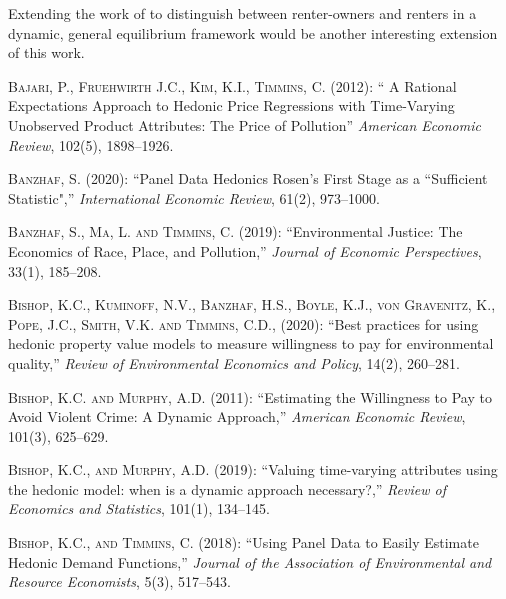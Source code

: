\documentclass[ecta,nameyear,draft]{econsocart}
\theoremstyle{plain}
\theoremstyle{remark}
\begin{document}
Extending the work of \cite{kanemoto88} to distinguish between renter-owners and renters in a dynamic, general equilibrium framework would be another interesting extension of this work.
\begin{thebibliography}{}
%

\textsc{Bajari, P., Fruehwirth J.C., Kim, K.I., Timmins, C.} (2012):
`` A Rational Expectations Approach to Hedonic Price Regressions with Time-Varying Unobserved Product Attributes: The Price of Pollution''
\textit{American Economic Review}, 102(5), 1898--1926.
\endbibitem

\textsc{Banzhaf, S.} (2020):
``Panel Data Hedonics Rosen’s First Stage as a “Sufficient
Statistic",''
\textit{International Economic Review}, 61(2), 973--1000.
\endbibitem


\textsc{Banzhaf, S., Ma, L. and Timmins, C.} (2019):
``Environmental Justice: The Economics of Race, Place, and Pollution,''
\textit{Journal of Economic Perspectives}, 33(1), 185--208.
\endbibitem

\textsc{Bishop, K.C., Kuminoff, N.V., Banzhaf, H.S., Boyle, K.J., von Gravenitz, K., Pope, J.C., Smith, V.K. and Timmins, C.D., } (2020):
``Best practices for using hedonic property value models to measure willingness to pay for environmental quality,''
\textit{Review of Environmental Economics and Policy}, 14(2), 260--281.
\endbibitem

\textsc{Bishop, K.C. and Murphy, A.D.} (2011):
``Estimating the Willingness to Pay to Avoid Violent Crime: A Dynamic Approach,''
\textit{American Economic Review}, 101(3), 625--629.
\endbibitem

\textsc{Bishop, K.C., and Murphy, A.D.} (2019):
``Valuing time-varying attributes using the hedonic model: when is a dynamic approach necessary?,''
\textit{Review of Economics and Statistics}, 101(1), 134--145.
\endbibitem

\textsc{Bishop, K.C., and Timmins, C.} (2018):
``Using Panel Data to Easily Estimate Hedonic Demand Functions,''
\textit{Journal of the Association of Environmental and Resource Economists}, 5(3), 517--543.
\endbibitem


\end{thebibliography}
\end{document}
